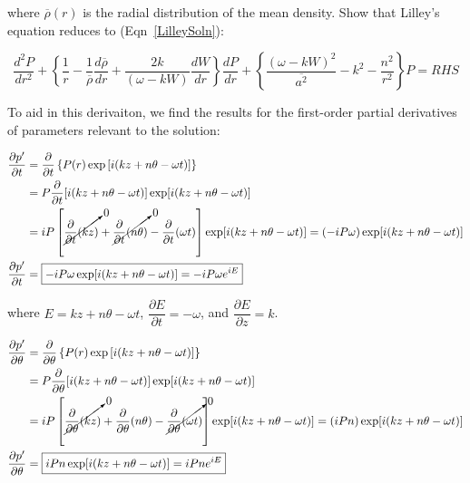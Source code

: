 \documentclass[]{aiaa-tc}%
\begin{document}
\noindent where $\overline{\rho}(r)$ is the radial distribution of the mean density.  Show that Lilley's equation reduces to (Eqn~\ref{LilleySoln}):

\begin{equation} \label{LilleySoln}
\dfrac{d^2 P}{dr^2}
+ \left\{ \dfrac{1}{r}
  - \dfrac{1}{\overline{\rho}} \dfrac{d\overline{\rho}}{dr}
  + \dfrac{2k}{(\omega - kW)} \dfrac{dW}{dr}
\right\} \dfrac{dP}{dr}
+ \left\{ \dfrac{(\omega - kW)^2}{\overline{a^2}} - k^2 - \dfrac{n^2}{r^2}
\right\} P = RHS
\end{equation}

To aid in this derivaiton, we find the results for the first-order partial derivatives of parameters relevant to the solution:

\newcommand\expterm{i(kz + n\theta -\omega t)}%
\begin{equation} \label{dpdt}
\begin{split}
\dfrac{\partial p'}{\partial t} &= \dfrac{\partial}{\partial t}
  \left\{ P(r) \exp\left[ \expterm \right]\right\} \\
&= P \dfrac{\partial}{\partial t} [\expterm] \exp[\expterm] \\
&= iP \left[\cancelto{0}{\dfrac{\partial}{\partial t}(kz)      }
          + \cancelto{0}{\dfrac{\partial}{\partial t}(n\theta)}
                       - \dfrac{\partial}{\partial t}(\omega t)
    \right] \exp[\expterm]
    = (-iP\omega) \exp[\expterm] \\
\dfrac{\partial p'}{\partial t} &= \boxed{-iP\omega \exp[\expterm] = -iP\omega e^{iE} }
\end{split}
\end{equation}

\noindent where $E=kz + n\theta -\omega t$, $\dfrac{\partial E}{\partial t} = -\omega$, and $\dfrac{\partial E}{\partial z} = k$.


\begin{equation} \label{dpdtheta}
\begin{split}
\dfrac{\partial p'}{\partial \theta} &= \dfrac{\partial}{\partial \theta}
  \left\{ P(r) \exp\left[ \expterm \right]\right\} \\
&= P \dfrac{\partial}{\partial \theta} [\expterm] \exp[\expterm] \\
&= iP \left[\cancelto{0}{\dfrac{\partial}{\partial \theta}(kz)      }
                      + \dfrac{\partial}{\partial \theta}(n\theta)
          - \cancelto{0}{\dfrac{\partial}{\partial \theta}(\omega t)}
    \right] \exp[\expterm]
    = (iPn) \exp[\expterm] \\
\dfrac{\partial p'}{\partial \theta} &= \boxed{iPn \exp[\expterm] = iPn e^{iE} }
\end{split}
\end{equation}
\end{document}
